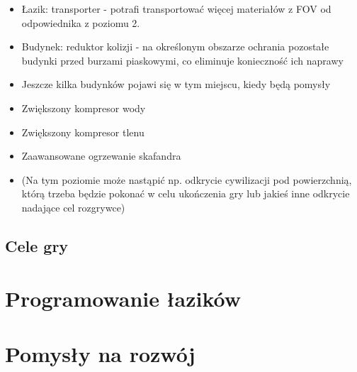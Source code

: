\documentclass[a4paper,12pt]{article}
\begin{document}
\begin{itemize}
\begin{itemize}
		\item Łazik: transporter - potrafi transportować więcej materiałów z FOV od odpowiednika z poziomu 2.
		\item Budynek: reduktor kolizji - na określonym obszarze ochrania pozostałe budynki przed burzami piaskowymi, co eliminuje konieczność ich naprawy
		\item Jeszcze kilka budynków pojawi się w tym miejscu, kiedy będą pomysły
		\item Zwiększony kompresor wody
		\item Zwiększony kompresor tlenu
		\item Zaawansowane ogrzewanie skafandra
		\item (Na tym poziomie może nastąpić np. odkrycie cywilizacji pod powierzchnią, którą trzeba będzie pokonać w celu ukończenia gry lub jakieś inne odkrycie nadające cel rozgrywce)
	\end{itemize}
\end{itemize}
\subsection{Cele gry}
\section{Programowanie łazików}
\section{Pomysły na rozwój}
\end{document}
